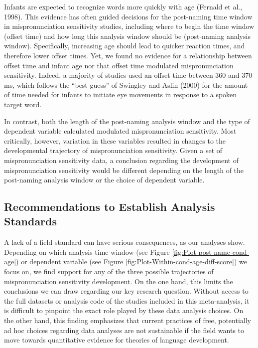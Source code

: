 \documentclass[man]{apa6}
\theoremstyle{definition}
\theoremstyle{definition}
\theoremstyle{definition}
\theoremstyle{remark}
\begin{document}
Infants are expected to recognize words more quickly with age (Fernald
et al., 1998). This evidence has often guided decisions for the
post-naming time window in mispronunciation sensitivity studies,
including where to begin the time window (offset time) and how long this
analysis window should be (post-naming analysis window). Specifically,
increasing age should lead to quicker reaction times, and therefore
lower offset times. Yet, we found no evidence for a relationship between
offset time and infant age nor that offset time modulated
mispronunciation sensitivity. Indeed, a majority of studies used an
offset time between 360 and 370 ms, which follows the \enquote{best
guess} of Swingley and Aslin (2000) for the amount of time needed for
infants to initiate eye movements in response to a spoken target word.

In contrast, both the length of the post-naming analysis window and the
type of dependent variable calculated modulated mispronunciation
sensitivity. Most critically, however, variation in these variables
resulted in changes to the developmental trajectory of mispronunciation
sensitivity. Given a set of mispronunciation sensitivity data, a
conclusion regarding the development of mispronunciation sensitivity
would be different depending on the length of the post-naming analysis
window or the choice of dependent variable.

\subsection{Recommendations to Establish Analysis
Standards}\label{recommendations-to-establish-analysis-standards}

A lack of a field standard can have serious consequences, as our
analyses show. Depending on which analysis time window (see Figure
\ref{fig:Plot-post-name-cond-age}) or dependent variable (see Figure
\ref{fig:Plot-Within-cond-age-diff-score}) we focus on, we find support
for any of the three possible trajectories of mispronunciation
sensitivity development. On the one hand, this limits the conclusions we
can draw regarding our key research question. Without access to the full
datasets or analysis code of the studies included in this meta-analysis,
it is difficult to pinpoint the exact role played by these data analysis
choices. On the other hand, this finding emphasizes that current
practices of free, potentially ad hoc choices regarding data analyses
are not sustainable if the field wants to move towards quantitative
evidence for theories of language development.
\end{document}
